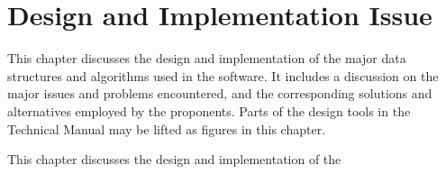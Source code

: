 \chapter{Design and Implementation Issue}\label{ch:design}

This chapter discusses the design and implementation of the major data structures and algorithms used in the software. It includes a discussion on the major issues and problems encountered, and the corresponding solutions and alternatives employed by the proponents. Parts of the design tools in the Technical Manual may be lifted as figures in this chapter.

This chapter discusses the design and implementation of the

